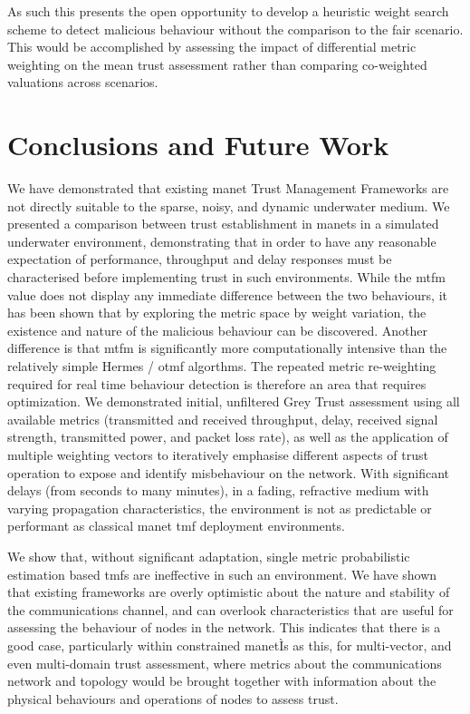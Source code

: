 As such this presents the open opportunity to develop a heuristic weight search scheme to detect malicious behaviour without the comparison to the fair scenario.
This would be accomplished by assessing the impact of differential metric weighting on the mean trust assessment rather than comparing co-weighted valuations across scenarios.


\section{Conclusions and Future Work}
We have demonstrated that existing \gls{manet} Trust Management Frameworks are not directly suitable to the sparse, noisy, and dynamic underwater medium.
We presented a comparison between trust establishment in \gls{manet}s in a simulated underwater environment, demonstrating that in order to have any reasonable expectation of performance, throughput and delay responses must be characterised before implementing trust in such environments. 
While the \gls{mtfm} value does not display any immediate difference between the two behaviours, it has been shown that by exploring the metric space by weight variation, the existence and nature of the malicious behaviour can be discovered.
Another difference is that \gls{mtfm} is significantly more computationally intensive than the relatively simple Hermes / \gls{otmf} algorthms.
The repeated metric re-weighting required for real time behaviour detection is therefore an area that requires optimization.
We demonstrated initial, unfiltered Grey Trust assessment using all available metrics (transmitted and received throughput, delay, received signal strength, transmitted power, and packet loss rate), as well as the application of multiple weighting vectors to iteratively emphasise different aspects of trust operation to expose and identify misbehaviour on the network.
With significant delays (from seconds to many minutes), in a fading, refractive medium with varying propagation characteristics, the environment is not as predictable or performant as classical \gls{manet} \gls{tmf} deployment environments.

We show that, without significant adaptation, single metric probabilistic estimation based \glspl{tmf} are ineffective in such an environment.
We have shown that existing frameworks are overly optimistic about the nature and stability of the communications channel, and can overlook characteristics that are useful for assessing the behaviour of nodes in the network. 
This indicates that there is a good case, particularly within constrained \gls{manet}Ìs as this, for multi-vector, and even multi-domain trust assessment, where metrics about the communications network and topology would be brought together with information about the physical behaviours and operations of nodes to assess trust.

